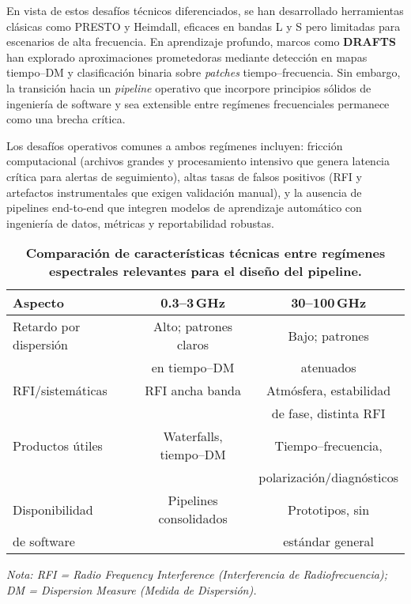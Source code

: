 \medskip

En vista de estos desafíos técnicos diferenciados, se han desarrollado herramientas clásicas como PRESTO y Heimdall, eficaces en bandas L y S pero limitadas para escenarios de alta frecuencia. En aprendizaje profundo, marcos como \textbf{DRAFTS} han explorado aproximaciones prometedoras mediante detección en mapas tiempo--DM y clasificación binaria sobre \emph{patches} tiempo--frecuencia. Sin embargo, la transición hacia un \textit{pipeline} operativo que incorpore principios sólidos de ingeniería de software y sea extensible entre regímenes frecuenciales permanece como una brecha crítica.

Los desafíos operativos comunes a ambos regímenes incluyen: fricción computacional (archivos grandes y procesamiento intensivo que genera latencia crítica para alertas de seguimiento), altas tasas de falsos positivos (RFI y artefactos instrumentales que exigen validación manual), y la ausencia de pipelines end-to-end que integren modelos de aprendizaje automático con ingeniería de datos, métricas y reportabilidad robustas.


\begin{table}[h]
\centering
\caption{\textbf{Comparación de características técnicas entre regímenes espectrales relevantes para el diseño del pipeline.}}
\vspace{0.5em}
\small
\begin{tabular}{l c c}
\toprule
\textbf{Aspecto} & \textbf{0.3--3\,GHz} & \textbf{30--100\,GHz} \\
\midrule
Retardo por dispersión & Alto; patrones claros & Bajo; patrones \\
& en tiempo--DM & atenuados \\
\midrule
RFI/sistemáticas & RFI ancha banda & Atmósfera, estabilidad \\
& & de fase, distinta RFI \\
\midrule
Productos útiles & Waterfalls, tiempo--DM & Tiempo--frecuencia, \\
& & polarización/diagnósticos \\
\midrule
Disponibilidad & Pipelines consolidados & Prototipos, sin \\
de software & & estándar general \\
\bottomrule
\end{tabular}

\vspace{0.3em}
\raggedright
\small{\textit{Nota: RFI = Radio Frequency Interference (Interferencia de Radiofrecuencia); DM = Dispersion Measure (Medida de Dispersión).}}
\end{table}


